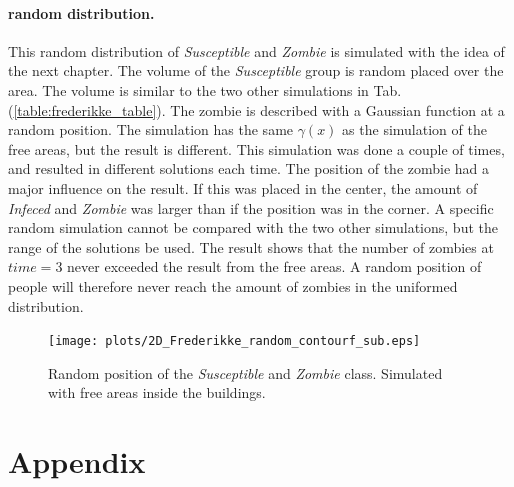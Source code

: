 \documentclass[%
twoside,                 %
final,                   %
10pt]{article}
\begin{document}
\noindent
\paragraph{random distribution.}
This random distribution of \emph{Susceptible} and \emph{Zombie} is simulated with the idea of the next chapter. The volume of the \emph{Susceptible} group is random placed over the area. The volume is similar to the two other simulations in Tab.(\ref{table:frederikke_table}). The zombie is described with a Gaussian function at a random position. The simulation has the same $\gamma(x)$ as the simulation of the free areas, but the result is different. This simulation was done a couple of times, and resulted in different solutions each time. The position of the zombie had a major influence on the result. If this was placed in the center, the amount of \emph{Infeced} and \emph{Zombie} was larger than if the position was in the corner. A specific random simulation cannot be compared with the two other simulations, but the range of the solutions be used. The result shows that the number of zombies at $time=3$ never exceeded the result from the free areas. A random position of people will therefore never reach the amount of zombies in the uniformed distribution.


\begin{figure}[ht]
  \centerline{\texttt{[image: plots/2D\_Frederikke\_random\_contourf\_sub.eps]}}
  \caption{
  \label{fig:frederikke_random} Random position of the \emph{Susceptible} and \emph{Zombie} class. Simulated with free areas inside the buildings.
  }
\end{figure}



\section{Appendix}
\end{document}
